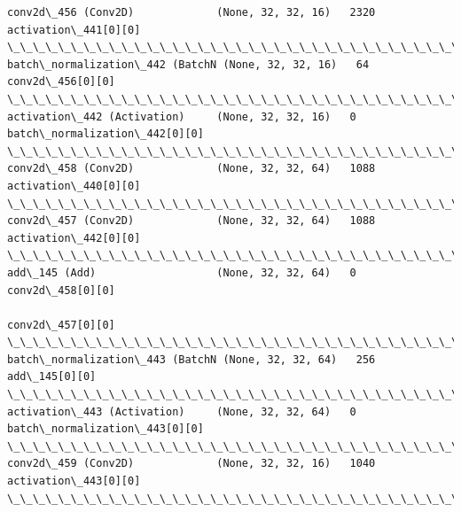 \documentclass[11pt]{article}
\begin{document}
\begin{Verbatim}[commandchars=\\\{\}]
conv2d\_456 (Conv2D)             (None, 32, 32, 16)   2320        activation\_441[0][0]             
\_\_\_\_\_\_\_\_\_\_\_\_\_\_\_\_\_\_\_\_\_\_\_\_\_\_\_\_\_\_\_\_\_\_\_\_\_\_\_\_\_\_\_\_\_\_\_\_\_\_\_\_\_\_\_\_\_\_\_\_\_\_\_\_\_\_\_\_\_\_\_\_\_\_\_\_\_\_\_\_\_\_\_\_\_\_\_\_\_\_\_\_\_\_\_\_\_\_
batch\_normalization\_442 (BatchN (None, 32, 32, 16)   64          conv2d\_456[0][0]                 
\_\_\_\_\_\_\_\_\_\_\_\_\_\_\_\_\_\_\_\_\_\_\_\_\_\_\_\_\_\_\_\_\_\_\_\_\_\_\_\_\_\_\_\_\_\_\_\_\_\_\_\_\_\_\_\_\_\_\_\_\_\_\_\_\_\_\_\_\_\_\_\_\_\_\_\_\_\_\_\_\_\_\_\_\_\_\_\_\_\_\_\_\_\_\_\_\_\_
activation\_442 (Activation)     (None, 32, 32, 16)   0           batch\_normalization\_442[0][0]    
\_\_\_\_\_\_\_\_\_\_\_\_\_\_\_\_\_\_\_\_\_\_\_\_\_\_\_\_\_\_\_\_\_\_\_\_\_\_\_\_\_\_\_\_\_\_\_\_\_\_\_\_\_\_\_\_\_\_\_\_\_\_\_\_\_\_\_\_\_\_\_\_\_\_\_\_\_\_\_\_\_\_\_\_\_\_\_\_\_\_\_\_\_\_\_\_\_\_
conv2d\_458 (Conv2D)             (None, 32, 32, 64)   1088        activation\_440[0][0]             
\_\_\_\_\_\_\_\_\_\_\_\_\_\_\_\_\_\_\_\_\_\_\_\_\_\_\_\_\_\_\_\_\_\_\_\_\_\_\_\_\_\_\_\_\_\_\_\_\_\_\_\_\_\_\_\_\_\_\_\_\_\_\_\_\_\_\_\_\_\_\_\_\_\_\_\_\_\_\_\_\_\_\_\_\_\_\_\_\_\_\_\_\_\_\_\_\_\_
conv2d\_457 (Conv2D)             (None, 32, 32, 64)   1088        activation\_442[0][0]             
\_\_\_\_\_\_\_\_\_\_\_\_\_\_\_\_\_\_\_\_\_\_\_\_\_\_\_\_\_\_\_\_\_\_\_\_\_\_\_\_\_\_\_\_\_\_\_\_\_\_\_\_\_\_\_\_\_\_\_\_\_\_\_\_\_\_\_\_\_\_\_\_\_\_\_\_\_\_\_\_\_\_\_\_\_\_\_\_\_\_\_\_\_\_\_\_\_\_
add\_145 (Add)                   (None, 32, 32, 64)   0           conv2d\_458[0][0]                 
                                                                 conv2d\_457[0][0]                 
\_\_\_\_\_\_\_\_\_\_\_\_\_\_\_\_\_\_\_\_\_\_\_\_\_\_\_\_\_\_\_\_\_\_\_\_\_\_\_\_\_\_\_\_\_\_\_\_\_\_\_\_\_\_\_\_\_\_\_\_\_\_\_\_\_\_\_\_\_\_\_\_\_\_\_\_\_\_\_\_\_\_\_\_\_\_\_\_\_\_\_\_\_\_\_\_\_\_
batch\_normalization\_443 (BatchN (None, 32, 32, 64)   256         add\_145[0][0]                    
\_\_\_\_\_\_\_\_\_\_\_\_\_\_\_\_\_\_\_\_\_\_\_\_\_\_\_\_\_\_\_\_\_\_\_\_\_\_\_\_\_\_\_\_\_\_\_\_\_\_\_\_\_\_\_\_\_\_\_\_\_\_\_\_\_\_\_\_\_\_\_\_\_\_\_\_\_\_\_\_\_\_\_\_\_\_\_\_\_\_\_\_\_\_\_\_\_\_
activation\_443 (Activation)     (None, 32, 32, 64)   0           batch\_normalization\_443[0][0]    
\_\_\_\_\_\_\_\_\_\_\_\_\_\_\_\_\_\_\_\_\_\_\_\_\_\_\_\_\_\_\_\_\_\_\_\_\_\_\_\_\_\_\_\_\_\_\_\_\_\_\_\_\_\_\_\_\_\_\_\_\_\_\_\_\_\_\_\_\_\_\_\_\_\_\_\_\_\_\_\_\_\_\_\_\_\_\_\_\_\_\_\_\_\_\_\_\_\_
conv2d\_459 (Conv2D)             (None, 32, 32, 16)   1040        activation\_443[0][0]             
\_\_\_\_\_\_\_\_\_\_\_\_\_\_\_\_\_\_\_\_\_\_\_\_\_\_\_\_\_\_\_\_\_\_\_\_\_\_\_\_\_\_\_\_\_\_\_\_\_\_\_\_\_\_\_\_\_\_\_\_\_\_\_\_\_\_\_\_\_\_\_\_\_\_\_\_\_\_\_\_\_\_\_\_\_\_\_\_\_\_\_\_\_\_\_\_\_\_

\end{Verbatim}
\end{document}
